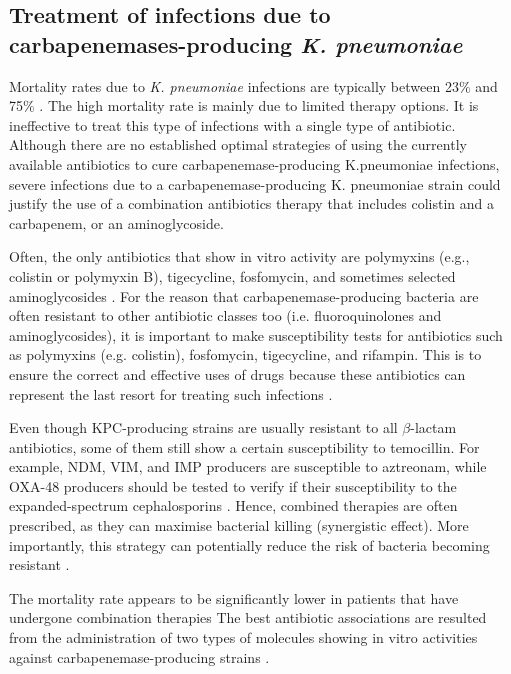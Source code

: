 \documentclass[11pt]{report}
\begin{document}
\subsection{Treatment of infections due to carbapenemases-producing \emph{K. pneumoniae}}
Mortality rates due to \emph{K. pneumoniae} infections are typically between 23$\%$ and 75$\%$ \cite{karaiskos2014multidrug}.
The high mortality rate is mainly due to limited therapy options. It is ineffective to treat this type of infections with a single type of antibiotic. Although there are no established optimal strategies of using the currently available antibiotics to cure carbapenemase-producing K.pneumoniae infections, severe infections due to a carbapenemase-producing K. pneumoniae strain could justify the use of a combination antibiotics therapy that includes colistin and a carbapenem, or an aminoglycoside.

Often, the only antibiotics that show in vitro activity are polymyxins (e.g., colistin or polymyxin B), tigecycline, fosfomycin, and sometimes selected aminoglycosides \cite{rodriguez2015diagnosis}.
For the reason that carbapenemase-producing bacteria are often resistant to other antibiotic classes too (i.e. fluoroquinolones and aminoglycosides), it is important to make susceptibility tests for antibiotics such as polymyxins (e.g. colistin), fosfomycin, tigecycline, and rifampin.
This is to ensure the correct and effective uses of drugs because these antibiotics can represent the last resort for treating such infections \cite{adams2009activity}.

Even though KPC-producing strains are usually resistant to all $\beta$-lactam antibiotics, some of them still show a certain susceptibility to temocillin.
For example, NDM, VIM, and IMP producers are susceptible to aztreonam, while OXA-48 producers should be tested to verify if their susceptibility to the expanded-spectrum cephalosporins \cite{girlich2009ctx}.
Hence, combined therapies are often prescribed, as they can maximise bacterial killing (synergistic effect).
More importantly, this strategy can potentially reduce the risk of bacteria becoming resistant \cite{Pitout2015}.

The mortality rate appears to be significantly lower in patients that have undergone combination therapies \cite{tzouvelekis2014treating, zavascki2013combination}
The best antibiotic associations are resulted from the administration of two types of molecules showing in vitro activities against carbapenemase-producing strains \cite{falagas2013antibiotic, tzouvelekis2014treating}.
\end{document}
